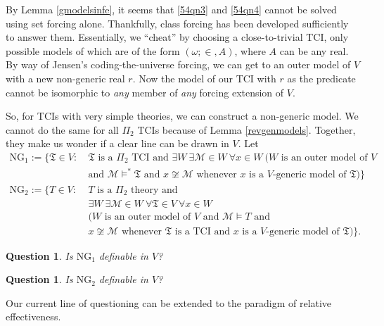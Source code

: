 \documentclass[12pt, twoside]{memoir}
\numberwithin{equation}{section}
\newtheorem{ques}[thm]{Question}
\theoremstyle{definition}
\theoremstyle{remark}
\theoremstyle{definition}
\theoremstyle{definition}
\theoremstyle{definition}
\theoremstyle{remark}
\begin{document}
By Lemma \ref{gmodelsinfe}, it seems that \ref{54qn3} and \ref{54qn4} cannot be solved using set forcing alone. Thankfully, class forcing has been developed sufficiently to answer them. Essentially, we ``cheat'' by choosing a close-to-trivial TCI, only possible models of which are of the form $(\omega; \in, A)$, where $A$ can be any real. By way of Jensen's coding-the-universe forcing, we can get to an outer model of $V$ with a new non-generic real $r$. Now the model of our TCI with $r$ as the predicate cannot be isomorphic to \emph{any} member of \emph{any} forcing extension of $V$. 

So, for TCIs with very simple theories, we can construct a non-generic model. We cannot do the same for all $\Pi_2$ TCIs because of Lemma \ref{revgenmodels}. Together, they make us wonder if a clear line can be drawn in $V$. Let 
\begin{align*}
    \mathrm{NG}_1 := \{\mathfrak{T} \in V : \ & \mathfrak{T} \text{ is a } \Pi_2 \text{ TCI and } \exists W \ \exists \mathcal{M} \! \in \! W \ \forall x \! \in \! W \ (W \text{ is an outer model of } V \\
    & \text{and } \mathcal{M} \models^* \mathfrak{T} \text{ and } x \not\cong \mathcal{M} \text{ whenever } x \text{ is a } V \text{-generic model of } \mathfrak{T})\} \\
    \mathrm{NG}_2 := \{T \in V : \ & T \text{ is a } \Pi_2 \text{ theory and } \\
    & \exists W \ \exists \mathcal{M} \! \in \! W \ \forall \mathfrak{T} \! \in \! V \ \forall x \! \in \! W \\
    & (W \text{ is an outer model of } V \text{ and } \mathcal{M} \models T \text{ and } \\
    & x \not\cong \mathcal{M} \text{ whenever } \mathfrak{T} \text{ is a TCI and } x \text{ is a } V \text{-generic model of } \mathfrak{T})\} \text{.}
\end{align*}

\begin{ques}\label{q548}
Is $\mathrm{NG}_1$ definable in $V$?
\end{ques}

\begin{ques}\label{q552}
Is $\mathrm{NG}_2$ definable in $V$?
\end{ques}

Our current line of questioning can be extended to the paradigm of relative effectiveness.
\end{document}
